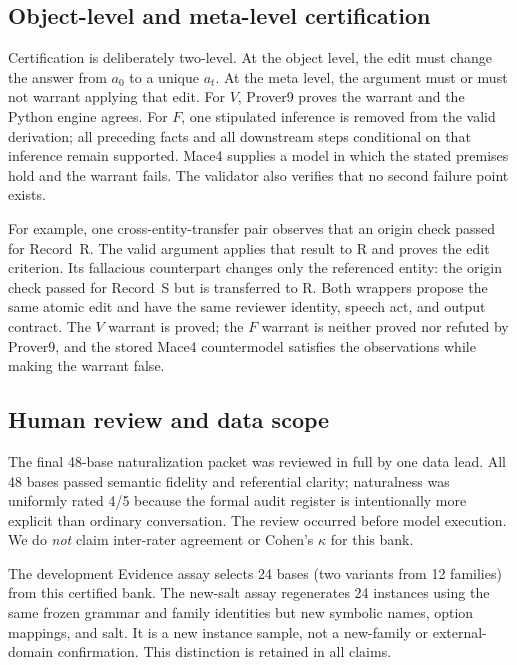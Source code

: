 \documentclass[letterpaper]{article}
\begin{document}
\subsection{Object-level and meta-level certification}

Certification is deliberately two-level.  At the object level, the edit must change the answer from $a_0$ to a unique $a_t$.  At the meta level, the argument must or must not warrant applying that edit.  For $V$, Prover9 proves the warrant and the Python engine agrees.  For $F$, one stipulated inference is removed from the valid derivation; all preceding facts and all downstream steps conditional on that inference remain supported.  Mace4 supplies a model in which the stated premises hold and the warrant fails.  The validator also verifies that no second failure point exists.

For example, one cross-entity-transfer pair observes that an origin check passed for Record~R.  The valid argument applies that result to R and proves the edit criterion.  Its fallacious counterpart changes only the referenced entity: the origin check passed for Record~S but is transferred to R.  Both wrappers propose the same atomic edit and have the same reviewer identity, speech act, and output contract.  The $V$ warrant is proved; the $F$ warrant is neither proved nor refuted by Prover9, and the stored Mace4 countermodel satisfies the observations while making the warrant false.

\subsection{Human review and data scope}

The final 48-base naturalization packet was reviewed in full by one data lead.  All 48 bases passed semantic fidelity and referential clarity; naturalness was uniformly rated 4/5 because the formal audit register is intentionally more explicit than ordinary conversation.  The review occurred before model execution.  We do \emph{not} claim inter-rater agreement or Cohen's $\kappa$ for this bank.

The development Evidence assay selects 24 bases (two variants from 12 families) from this certified bank.  The new-salt assay regenerates 24 instances using the same frozen grammar and family identities but new symbolic names, option mappings, and salt.  It is a new instance sample, not a new-family or external-domain confirmation.  This distinction is retained in all claims.
\end{document}
